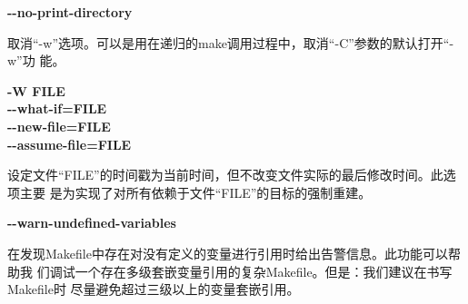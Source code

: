\begin{dinglist}{47}
  \item \begin{minipage}[t]{\linewidth}
          \textbf{-{}-no-print-directory}
        \end{minipage}

取消“-w”选项。可以是用在递归的make调用过程中，取消“-C”参数的默认打开“-w”功
能。

  \item \begin{minipage}[t]{\linewidth}
          \textbf{-W FILE} \\
          \textbf{-{}-what-if=FILE}\\
          \textbf{-{}-new-file=FILE}\\
          \textbf{-{}-assume-file=FILE}
        \end{minipage}

设定文件“FILE”的时间戳为当前时间，但不改变文件实际的最后修改时间。此选项主要
是为实现了对所有依赖于文件“FILE”的目标的强制重建。

  \item \begin{minipage}[t]{\linewidth}
          \textbf{-{}-warn-undefined-variables}
        \end{minipage}

在发现Makefile中存在对没有定义的变量进行引用时给出告警信息。此功能可以帮助我
们调试一个存在多级套嵌变量引用的复杂Makefile。但是：我们建议在书写Makefile时
尽量避免超过三级以上的变量套嵌引用。

\end{dinglist}
